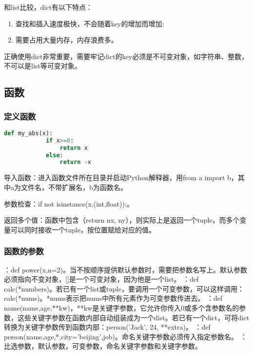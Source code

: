 \documentclass[12pt,a4paper]{article}
\begin{document}
\begin{CJK}{UTF8}{gbsn}
    和list比较，dict有以下特点：
    \begin{enumerate}
        \item 查找和插入速度极快，不会随着key的增加而增加;
        \item 需要占用大量内存，内存浪费多。
    \end{enumerate}

    正确使用dict非常重要，需要牢记dict的key必须是不可变对象，如字符串、整数，不可以是list等可变对象。
    \subsection{函数}
    \subsubsection{定义函数}
    \begin{lstlisting}[language=python]
        def my_abs(x):
            if x>=0:
                return x
            else:
                return -x
    \end{lstlisting}

    导入函数：进入函数文件所在目录并启动Python解释器，用from a import b，其中a为文件名，不带扩展名，b为函数名。

    参数检查：if not isinstance(x,(int,float)):。

    返回多个值：函数中包含（return nx, ny），则实际上是返回一个tuple，而多个变量可以同时接收一个tuple，按位置赋给对应的值。

    \subsubsection{函数的参数}
    \begin{enumerate}
        ：def power(x,n=2)。当不按顺序提供默认参数时，需要把参数名写上。默认参数必须指向不变对象，[]是一个可变对象，因为他是一个list。
        ：def calc(*numbers)。若已有一个list或tuple，要调用一个可变参数，可以这样调用：calc(*nums)。*nums表示把nums中所有元素作为可变参数传进去。
        ：def name(name,age,**kw)，**kw是关键字参数，它允许你传入0或多个含参数名的参数，这些关键字参数在函数内部自动组装成为一个dist。若已有一个dict，可将dict转换为关键字参数传到函数内部：person('Jack', 24, **extra)。
        ：def person(name,age,*,city='beijing',job)。命名关键字参数必须传入指定参数名。
        ：比选参数，默认参数，可变参数，命名关键字参数和关键字参数。
    \end{enumerate}

\end{CJK}
\end{document}
